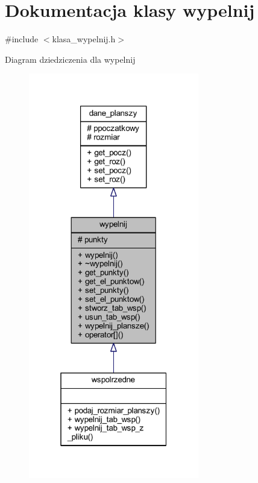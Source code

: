 \hypertarget{classwypelnij}{}\section{Dokumentacja klasy wypelnij}
\label{classwypelnij}


{\ttfamily \#include $<$klasa\+\_\+wypelnij.\+h$>$}



Diagram dziedziczenia dla wypelnij
\nopagebreak
\begin{figure}[H]
\begin{center}
\leavevmode
\includegraphics[width=211pt]{classwypelnij__inherit__graph}
\end{center}
\end{figure}


